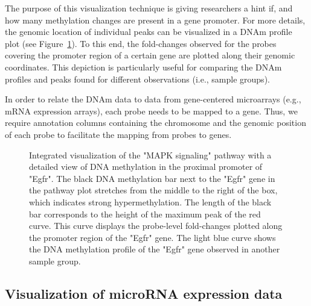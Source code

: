 \documentclass{bioinfo}
\begin{document}
The purpose of this visualization technique is giving researchers a hint if,
and how many methylation changes are present in a gene promoter.
For more details, the genomic location of individual peaks can be visualized in a DNAm profile plot
(see Figure~\ref{fig:methdetails}). To this end, the fold-changes observed for the probes
covering the promoter region of a certain gene are plotted along their genomic coordinates. This
depiction is particularly useful for comparing the DNAm profiles and peaks found for different
observations (i.e., sample groups).

In order to relate the DNAm data to data from gene-centered microarrays (e.g., mRNA expression
arrays), each probe needs to be mapped to a gene. Thus, we require annotation columns containing the
chromosome and the genomic position of each probe to facilitate the mapping from probes to genes.

\begin{figure}[tb]
\centering
\setlength\fboxsep{1pt}
\setlength\fboxrule{1pt}
\caption{Integrated visualization of the "MAPK signaling" pathway with a detailed view of DNA methylation
in the proximal promoter of "Egfr". The black DNA methylation bar next to the "Egfr" gene in the pathway
plot stretches from the middle to the right of the box, which indicates strong hypermethylation. The length
of the black bar corresponds to the height of the maximum peak of the red curve. This curve displays the probe-level
fold-changes plotted along the promoter region of the "Egfr" gene. The light blue curve shows the DNA methylation
profile of the "Egfr" gene observed in another sample group.}
\label{fig:methdetails}
\end{figure}

\subsection{Visualization of microRNA expression data}
\end{document}
